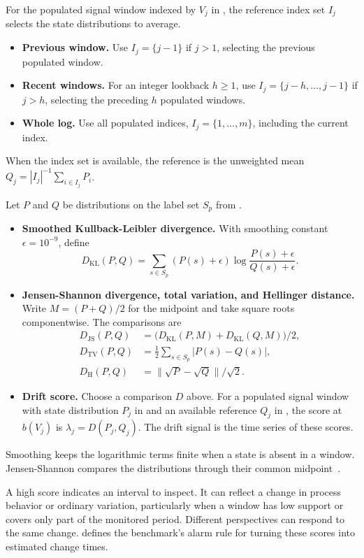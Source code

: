 \begin{Definition}\label{def:drift-reference}
For the populated signal window indexed by $V_j$ in , the reference index set $I_j$ selects the state distributions to average.
\begin{itemize}
  \item \textbf{Previous window.} Use $I_j=\{j-1\}$ if $j>1$, selecting the previous populated window.
  \item \textbf{Recent windows.} For an integer lookback $h\geq1$, use $I_j=\{j-h,\ldots,j-1\}$ if $j>h$, selecting the preceding $h$ populated windows.
  \item \textbf{Whole log.} Use all populated indices, $I_j=\{1,\ldots,m\}$, including the current index.
\end{itemize}
When the index set is available, the reference is the unweighted mean $Q_j=|I_j|^{-1}\sum_{i\in I_j}P_i$.
\end{Definition}

\begin{Definition}\label{def:drift-score}
Let $P$ and $Q$ be distributions on the label set $S_p$ from .
\begin{itemize}
  \item \textbf{Smoothed Kullback-Leibler divergence.} With smoothing constant $\epsilon=10^{-9}$, define
  \[
    D_{\mathrm{KL}}(P,Q)=
      \sum_{s\in S_p}(P(s)+\epsilon)\log\frac{P(s)+\epsilon}{Q(s)+\epsilon}.
  \]
  \item \textbf{Jensen-Shannon divergence, total variation, and Hellinger distance.} Write $M=(P+Q)/2$ for the midpoint and take square roots componentwise. The comparisons are
  \[
    \begin{aligned}
      D_{\mathrm{JS}}(P,Q)&=\bigl(D_{\mathrm{KL}}(P,M)+D_{\mathrm{KL}}(Q,M)\bigr)/2,\\
      D_{\mathrm{TV}}(P,Q)&=\tfrac12\sum_{s\in S_p}|P(s)-Q(s)|,\\
      D_{\mathrm H}(P,Q)&=\|\sqrt P-\sqrt Q\|/\sqrt{2}.
    \end{aligned}
  \]
  \item \textbf{Drift score.} Choose a comparison $D$ above. For a populated signal window with state distribution $P_j$ in  and an available reference $Q_j$ in , the score at $b(V_j)$ is $\lambda_j=D(P_j,Q_j)$. The drift signal is the time series of these scores.
\end{itemize}
\end{Definition}

Smoothing keeps the logarithmic terms finite when a state is absent in a window. Jensen-Shannon compares the distributions through their common midpoint~\cite{lin1991divergence}.



A high score indicates an interval to inspect. It can reflect a change in process behavior or ordinary variation, particularly when a window has low support or covers only part of the monitored period. Different perspectives can respond to the same change.  defines the benchmark's alarm rule for turning these scores into estimated change times.
